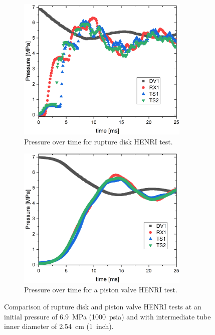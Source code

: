 \begin{figure}[htbp]
    \vspace{16pt}
    \centering
    \begin{subfigure}[t]{0.45\textwidth}
        \centering
        \includegraphics[width=0.9\textwidth]{results/plots/BurstDiskTest_1inch.png}
        \caption{Pressure over time for rupture disk HENRI test.}
        \label{fig:disk}
    \end{subfigure}
    \hfill
    \begin{subfigure}[t]{0.45\textwidth}
        \centering
        \includegraphics[width=0.9\textwidth]{results/plots/1000psi_MtMseal_25.png}
        \caption{Pressure over time for a piston valve HENRI test.}
        \label{fig:piston metal 1000psi}
    \end{subfigure}
    
    \caption{Comparison of rupture disk and piston valve HENRI tests at an initial pressure of \SI{6.9}{\mega\pascal} (\SI{1000}{psia}) and with intermediate tube inner diameter of \SI{2.54}{\centi\meter} (\SI{1}{inch}).}
    \label{fig:piston v disk}
    \vspace{16pt}
\end{figure}



